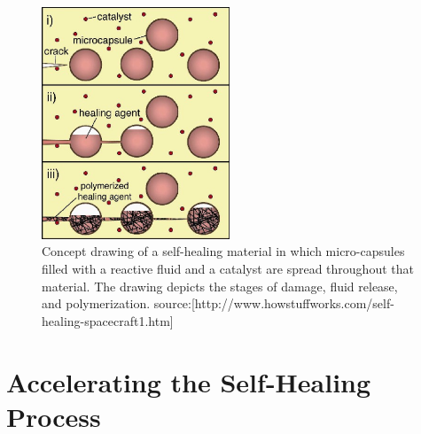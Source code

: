 \begin{figure}[ht!]
\centering
\includegraphics[width=0.5\textwidth]{eps_pics/selfHealingMedium}
\caption{ Concept drawing of a self-healing material in which micro-capsules filled with a reactive fluid and a catalyst are spread throughout that material. The drawing depicts the stages of damage, fluid release, and polymerization.
\newline
source:[http://www.howstuffworks.com/self-healing-spacecraft1.htm]
	 \label{fig:selfHealingMedium}} 
\end{figure}

\section{Accelerating the Self-Healing Process}

